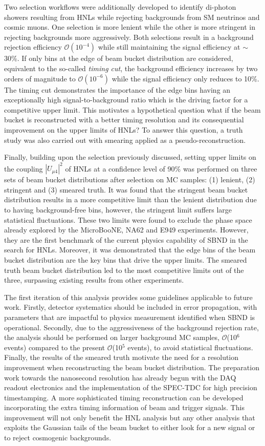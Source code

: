 Two selection workflows were additionally developed to identify di-photon showers resulting from HNLs while rejecting backgrounds from SM neutrinos and cosmic muons.
One selection is more lenient while the other is more stringent in rejecting backgrounds more aggressively.
Both selections result in a background rejection efficiency $\mathcal{O}(10^{-4})$ while still maintaining the signal efficiency at $\sim$30\%.
If only bins at the edge of beam bucket distribution are considered, equivalent to the so-called \textit{timing cut}, the background efficiency increases by two orders of magnitude to $\mathcal{O}(10^{-6})$ while the signal efficiency only reduces to 10\%. 
The timing cut demonstrates the importance of the edge bins having an exceptionally high signal-to-background ratio which is the driving factor for a competitive upper limit.
This motivates a hypothetical question what if the beam bucket is reconstructed with a better timing resolution and its consequential improvement on the upper limits of HNLs?
To answer this question, a truth study was also carried out with smearing applied as a pseudo-reconstruction. 

Finally, building upon the selection previously discussed, setting upper limits on the coupling $|U_{\mu4}|^2$ of HNLs at a confidence level of 90\% was performed on three sets of beam bucket distributions after selection on MC samples: (1) lenient, (2) stringent and (3) smeared truth.  
It was found that the stringent beam bucket distribution results in a more competitive limit than the lenient distribution due to having background-free bins, however, the stringent limit suffers large statistical fluctuations.
These two limits were found to exclude the phase space already explored by the MicroBooNE, NA62 and E949 experiments.
However, they are the first benchmark of the current physics capability of SBND in the search for HNLs.
Moreover, it was demonstrated that the edge bins of the beam bucket distribution are the key bins that drive the upper limits.   
The smeared truth beam bucket distribution led to the most competitive limits out of the three, surpassing existing results from other experiments.  

The first iteration of this analysis provides some guidelines applicable to future work.
Firstly, detector systematics should be included in error propagation, with parameters that are impactful to physics measurement identified when SBND is operational.
Secondly, due to the aggressiveness of the background rejection rate, the analysis should be performed on larger background MC samples, $\mathcal{O}$(10$^6$ events) compared to the present $\mathcal{
O}$(10$^5$ events), to avoid statistical fluctuations.
Finally, the results of the smeared truth motivate the need for a resolution improvement when reconstructing the beam bucket distribution.
The preparation work towards the nanosecond resolution has already begun with the DAQ readout electronics and the implementation of the SPEC-TDC for high precision timestamping.  
A more sophisticated timing reconstruction can be developed incorporating the extra timing information of beam and trigger signals.
This improvement will not only benefit the HNL analysis but any other analysis that exploits the Gaussian tails of the beam bucket to either look for a new signal or to reject cosmogenic backgrounds.
